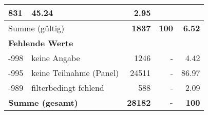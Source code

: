 \begin{longtable}{lXrrr}
       \num{831} &
       \num[round-mode=places,round-precision=2]{45,24} &
         \num[round-mode=places,round-precision=2]{2,95} \\
     \midrule
     \multicolumn{2}{l}{Summe (gültig)} &
       \textbf{\num{1837}} &
     \textbf{100} &
       \textbf{\num[round-mode=places,round-precision=2]{6,52}} \\
     \multicolumn{5}{l}{\textbf{Fehlende Werte}}\\
       -998 &
       keine Angabe &
         \num{1246} &
        - &
         \num[round-mode=places,round-precision=2]{4,42} \\
       -995 &
       keine Teilnahme (Panel) &
         \num{24511} &
        - &
         \num[round-mode=places,round-precision=2]{86,97} \\
       -989 &
       filterbedingt fehlend &
         \num{588} &
        - &
         \num[round-mode=places,round-precision=2]{2,09} \\
     \midrule
     \multicolumn{2}{l}{\textbf{Summe (gesamt)}} &
          \textbf{\num{28182}} &
        \textbf{-} &
        \textbf{100} \\
     \bottomrule
     \end{longtable}
     
